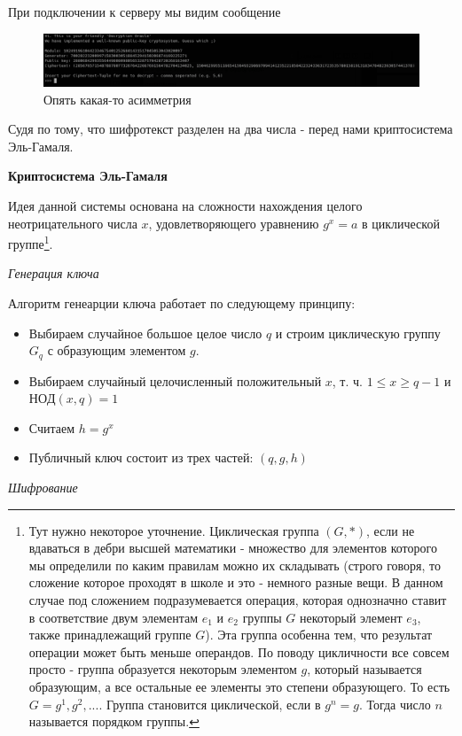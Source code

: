 \documentclass[idxtotoc,hyperref,openany,oneside]{files/crypto} %
\begin{document}
При подключении к серверу мы видим сообщение
\begin{figure}[H]
\begin{center}
\includegraphics[width=1.0\linewidth]{files/elgamal}
\end{center}
\caption{Опять какая-то асимметрия}
\label{fig:chinese}
\end{figure}
Судя по тому, что шифротекст разделен на два числа - перед нами криптосистема Эль-Гамаля.

\textbf{Криптосистема Эль-Гамаля}

Идея данной системы основана на сложности нахождения целого неотрицательного числа $x$, удовлетворяющего уравнению $g^x = a$ в циклической группе\footnote{Тут нужно некоторое уточнение. Циклическая группа $(G, *)$, если не вдаваться в дебри высшей математики - множество для элементов которого мы определили по каким правилам можно их складывать (строго говоря, то сложение которое проходят в школе и это - немного разные вещи. В данном случае под сложением подразумевается операция, которая однозначно ставит в соответствие двум элементам $e_1$ и $e_2$ группы $G$ некоторый элемент $e_3$, также принадлежащий группе $G$). Эта группа особенна тем, что результат операции может быть меньше операндов. По поводу цикличности все совсем просто - группа образуется некоторым элементом $g$, который называется образующим, а все остальные ее элементы это степени образующего. То есть $G = {g^1, g^2, ...}$. Группа становится циклической, если в $g^n = g$. Тогда число $n$ называется порядком группы.}. 

\textit{Генерация ключа}

Алгоритм генеарции ключа работает по следующему принципу:
\begin{itemize}
	\item Выбираем случайное большое целое число $q$ и строим циклическую группу $G_q$ с образующим элементом $g$.
	\item Выбираем случайный целочисленный положительный $x$, т. ч. $1 \leq x \geq q - 1$ и $НОД(x, q) = 1$
	\item Считаем $h = g^x$
	\item Публичный ключ состоит из трех частей: $(q, g, h)$
\end{itemize}

\textit{Шифрование}
\end{document}
